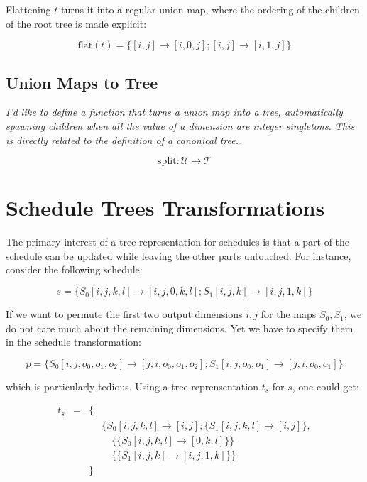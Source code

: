 \documentclass{article}
\begin{document}
Flattening $t$ turns it into a regular union map, where the ordering of the children of the root tree is made explicit:

\[
    \text{flat}(t) = \{ [i,j] \rightarrow [i,0,j] ; [i,j] \rightarrow [i,1,j] \}
\]

\subsection{Union Maps to Tree}

{ \raggedleft\emph{I'd like to define a function that turns a union map into a
tree, automatically spawning children when all the value of a dimension are
integer singletons. This is directly related to the definition of a canonical tree\dots} }

\[
    \text{split}: \mathcal{U} \rightarrow \mathcal{T}
\]



\section{Schedule Trees Transformations}

The primary interest of a tree representation for schedules is that a part of
the schedule can be updated while leaving the other parts untouched. For instance, consider the following schedule:

\[
    s = \{ S_0[i,j,k,l] \rightarrow [i,j,0,k,l] ; S_1[i,j,k] \rightarrow [i,j,1,k] \}
\]

If we want to permute the first two output dimensions $i, j$ for the maps
$S_0, S_1$, we do not care much about the remaining dimensions. Yet we have to
specify them in the schedule transformation:

\[
    p = \{ S_0[i,j,o_0,o_1,o_2] \rightarrow [j,i,o_0,o_1,o_2] ; S_1[i,j,o_0, o_1] \rightarrow [j,i,o_0,o_1] \}
\]

\noindent which is particularly tedious. Using a tree reprensentation $t_s$ for $s$, one could get:

\[
    \begin{array}{lcll}
        t_s &=& \{ &\\
            & &    & \{S_0[i,j,k,l] \rightarrow [i,j] ; \{S_1[i,j,k,l] \rightarrow [i,j] \},\\
            & &    & \quad\{ \{ S_0[i,j,k,l] \rightarrow [0,k,l] \} \}\\
            & &    & \quad\{ \{ S_1[i,j,k] \rightarrow [i,j,1,k] \} \}\\
            & & \} &\\
    \end{array}
\]
\end{document}
